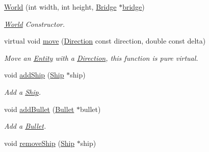 \begin{DoxyCompactItemize}
\item 
\hypertarget{classty_lib_1_1_world_a7fefec88b68ff37e655d4a2b8013b17e}{}\hyperlink{classty_lib_1_1_world_a7fefec88b68ff37e655d4a2b8013b17e}{World} (int width, int height, \hyperlink{classty_lib_1_1_bridge}{Bridge} $\ast$\hyperlink{classty_lib_1_1_world_a7046a485b63a96e8728766e53dfe9d58}{bridge})\label{classty_lib_1_1_world_a7fefec88b68ff37e655d4a2b8013b17e}

\begin{DoxyCompactList}\small\item\em \hyperlink{classty_lib_1_1_world}{World} Constructor. \end{DoxyCompactList}\item 
\hypertarget{classty_lib_1_1_world_acaea0024d90ad5f5451ef5ffead5d6d3}{}virtual void \hyperlink{classty_lib_1_1_world_acaea0024d90ad5f5451ef5ffead5d6d3}{move} (\hyperlink{classty_lib_1_1_direction}{Direction} const direction, double const delta)\label{classty_lib_1_1_world_acaea0024d90ad5f5451ef5ffead5d6d3}

\begin{DoxyCompactList}\small\item\em Move an \hyperlink{classty_lib_1_1_entity}{Entity} with a \hyperlink{classty_lib_1_1_direction}{Direction}, this function is pure virtual. \end{DoxyCompactList}\item 
\hypertarget{classty_lib_1_1_world_ab352b0dcf59091dc5ad5045a10401bc0}{}void \hyperlink{classty_lib_1_1_world_ab352b0dcf59091dc5ad5045a10401bc0}{add\+Ship} (\hyperlink{classty_lib_1_1_ship}{Ship} $\ast$ship)\label{classty_lib_1_1_world_ab352b0dcf59091dc5ad5045a10401bc0}

\begin{DoxyCompactList}\small\item\em Add a \hyperlink{classty_lib_1_1_ship}{Ship}. \end{DoxyCompactList}\item 
\hypertarget{classty_lib_1_1_world_a941e4fb886457e46c1588b51191b185c}{}void \hyperlink{classty_lib_1_1_world_a941e4fb886457e46c1588b51191b185c}{add\+Bullet} (\hyperlink{classty_lib_1_1_bullet}{Bullet} $\ast$bullet)\label{classty_lib_1_1_world_a941e4fb886457e46c1588b51191b185c}

\begin{DoxyCompactList}\small\item\em Add a \hyperlink{classty_lib_1_1_bullet}{Bullet}. \end{DoxyCompactList}\item 
\hypertarget{classty_lib_1_1_world_a279eae49007364611d876a236906b433}{}void \hyperlink{classty_lib_1_1_world_a279eae49007364611d876a236906b433}{remove\+Ship} (\hyperlink{classty_lib_1_1_ship}{Ship} $\ast$ship)\label{classty_lib_1_1_world_a279eae49007364611d876a236906b433}


\end{DoxyCompactItemize}
